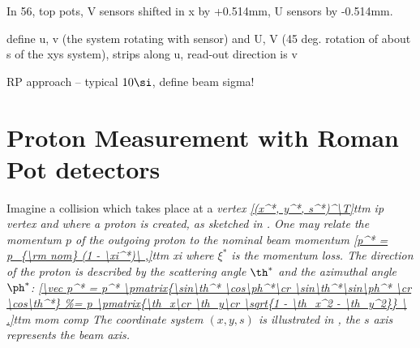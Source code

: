 
In 56, top pots, V sensors shifted in x by +0.514mm, U sensors by -0.514mm.

\> define u, v (the system rotating with sensor) and U, V (45 deg. rotation of about s of the xys system), strips along u, read-out direction is v

\> RP approach -- typical $10\si$, define beam sigma!


\iffalse
\bmfig
\fig[8cm]{fig/external/RP_stations_original.pdf}{s}{[7cm]RP stations}
\fig[6cm]{fig/external/rp_unit.jpg}{rp unit}{[7cm]RP unit}
\emfig

\bmfig
\fig[6cm]{fig/external/rp.jpg}{rp rp}{[7cm]A Roman Pot}
\fig[6cm]{fig/external/rp_package.jpg}{rp package}{[7cm]Detector package}
\emfig

\bmfig
\fig[6cm]{fig/external/hybrid2.jpg}{rp hybrid}{[7cm]A hybrid with a silicon detector and four VFAT chips.}
\fig[6cm]{fig/external/silicon_explained.png}{rp sensor}{[7cm]A detail of a silicon sensor.}
\emfig
\fi

\section[rp measurement]{Proton Measurement with Roman Pot detectors}



Imagine a collision which takes place at a \em{vertex}
\eqref{(x^*, y^*, s^*)^\T}{ttm ip vertex}
and where a proton is created, as sketched in . One may relate the momentum $p$ of the outgoing proton to the nominal beam momentum
\eqref{p^* = p_{\rm nom} (1 - \xi^*)\ ,}{ttm xi}
where $\xi^*$ is the \em{momentum loss}. The direction of the proton is described by the \em{scattering angle} $\th^*$ and the \em{azimuthal angle} $\ph^*$:
\eqref{\vec p^* = p^* \pmatrix{\sin\th^* \cos\ph^*\cr \sin\th^*\sin\ph^* \cr \cos\th^*}
\ .}{ttm mom comp}
The coordinate system $(x, y, s)$ is illustrated in , the $s$ axis represents the beam axis.

